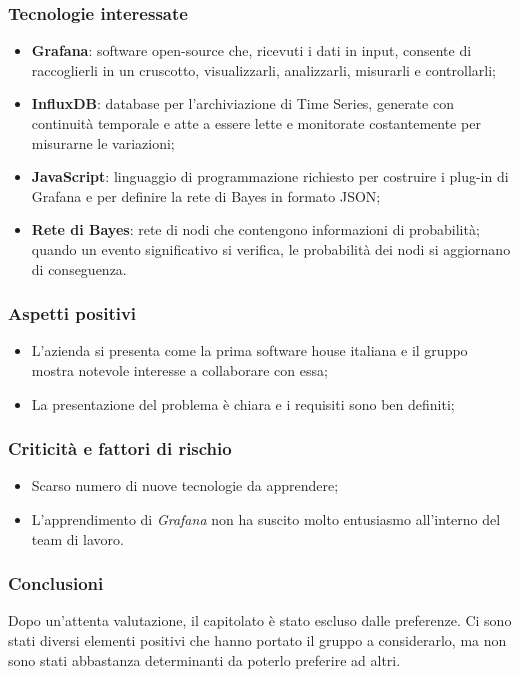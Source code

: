 \subsubsection{Tecnologie interessate}
\begin{itemize}
	\item \textbf{Grafana}: software open-source\glo{} che, ricevuti i dati in 
input,
	 consente di raccoglierli in un cruscotto, visualizzarli, analizzarli, 
	 misurarli e controllarli;
	\item \textbf{InfluxDB}: database per l'archiviazione di Time Series\glo{}, generate con 
continuità
	 temporale e atte a essere lette e monitorate costantemente per misurarne 
	 le variazioni;
	\item \textbf{JavaScript}: linguaggio di programmazione richiesto per costruire i plug-in\glo{} di Grafana e per definire la rete di Bayes\glo{} in formato JSON\glo;
	\item \textbf{Rete di Bayes}: rete di nodi che contengono informazioni di 
probabilità; quando un evento significativo si verifica, le probabilità dei nodi si aggiornano di conseguenza.
\end{itemize}
\subsubsection{Aspetti positivi}
\begin{itemize}
	\item L'azienda si presenta come la prima software house italiana e il gruppo 
mostra 
	notevole interesse a collaborare con essa;
	\item La presentazione del problema è chiara e i requisiti sono ben definiti;
\end{itemize}
\subsubsection{Criticità e fattori di rischio}
\begin{itemize}
	\item Scarso numero di nuove tecnologie da apprendere;
	\item L'apprendimento di \textit{Grafana} non ha suscito molto 
	entusiasmo all'interno del team di lavoro.
\end{itemize}
\subsubsection{Conclusioni}
Dopo un'attenta valutazione, il capitolato è stato escluso dalle preferenze. Ci 
sono stati diversi elementi positivi che hanno portato il gruppo a considerarlo,
ma non sono stati abbastanza determinanti da poterlo preferire ad altri.

